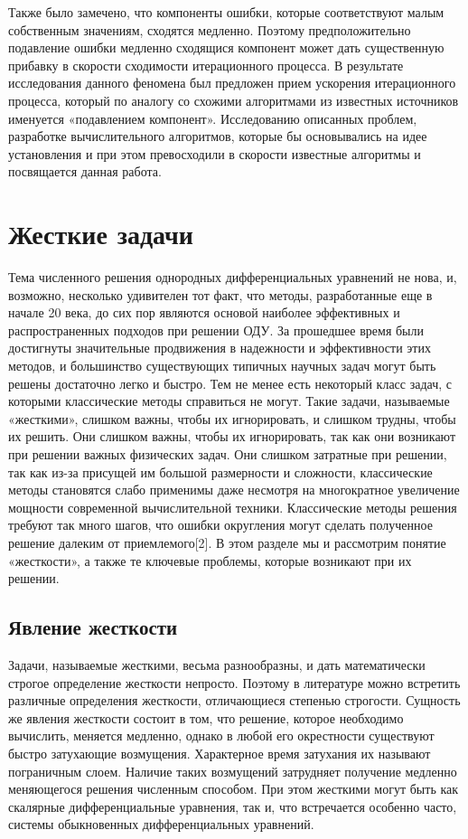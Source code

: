 \documentclass[a4paper,12pt]{report}
\begin{document}
Также было замечено, что компоненты ошибки, которые соответствуют малым собственным значениям, сходятся медленно. Поэтому предположительно подавление ошибки медленно сходящися компонент может дать существенную прибавку в скорости сходимости итерационного процесса. В результате исследования данного феномена был предложен прием ускорения итерационного процесса, который  по аналогу со схожими алгоритмами из известных источников именуется «подавлением компонент».
Исследованию описанных проблем, разработке вычислительного алгоритмов, которые бы основывались на идее установления и при этом превосходили в скорости известные алгоритмы и посвящается данная работа.
  \label{c:intro}


  \chapter{Жесткие задачи}
  \label{c:stiff_problems}
  Тема численного решения однородных дифференциальных уравнений не нова, и, возможно, несколько удивителен тот факт, что методы, разработанные еще в начале 20 века, до сих пор являются основой наиболее эффективных и распространенных подходов при решении ОДУ. За прошедшее время были достигнуты значительные продвижения в надежности и эффективности этих методов, и большинство существующих типичных научных задач могут быть решены достаточно легко и быстро. Тем не менее есть некоторый класс задач, с которыми классические методы справиться не могут. Такие задачи, называемые «жесткими», слишком важны, чтобы их игнорировать, и слишком трудны, чтобы их решить. Они слишком важны, чтобы их игнорировать, так как они возникают при решении важных физических задач. Они слишком затратные при решении, так как из-за присущей им большой размерности и сложности, классические методы становятся слабо применимы даже несмотря на многократное увеличение мощности современной вычислительной техники. Классические методы решения требуют так много шагов, что ошибки округления могут сделать полученное решение далеким от приемлемого[2]. В этом разделе мы и рассмотрим понятие «жесткости», а также те ключевые проблемы, которые возникают при их решении.

  \section{Явление жесткости}
  \label{s:stiffness}
  Задачи, называемые жесткими, весьма разнообразны, и дать математически строгое определение жесткости непросто. Поэтому в литературе можно встретить различные определения жесткости, отличающиеся степенью строгости. Сущность же явления жесткости состоит в том, что решение, которое необходимо вычислить, меняется медленно, однако в любой его окрестности существуют быстро затухающие возмущения. Характерное время затухания их называют пограничным слоем. Наличие таких возмущений затрудняет получение медленно меняющегося решения численным способом. При этом жесткими могут быть как скалярные дифференциальные уравнения, так и, что встречается особенно часто, системы обыкновенных дифференциальных уравнений.
  
\end{document}
